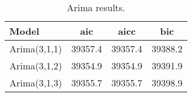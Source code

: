 \begin{table}[ht]
\centering
\caption[Arima results.]{Arima results.} 
\label{tab:chp_ts:arima_res_r}
\begin{tabular}{lccc}
  \toprule Model & aic & aicc & bic \\ 
  \midrule Arima(3,1,1) & 39357.4 & 39357.4 & 39388.2 \\ 
  Arima(3,1,2) & 39354.9 & 39354.9 & 39391.9 \\ 
  Arima(3,1,3) & 39355.7 & 39355.7 & 39398.9 \\ 
   \bottomrule \end{tabular}
\end{table}
